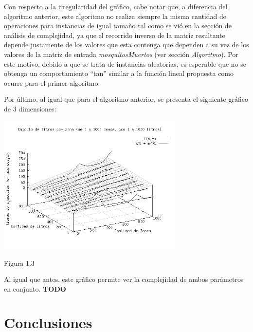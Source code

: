 \documentclass[a4paper,11pt] {article}
\begin{document}
Con respecto a la irregularidad del gr\'afico, cabe notar que, a diferencia del algoritmo anterior, este algoritmo no realiza siempre la misma cantidad de operaciones para instancias de igual tamaño tal como se vi\'o en la secci\'on de an\'alisis de complejidad, ya que el recorrido inverso de la matriz resultante depende justamente de los valores que esta contenga que dependen a su vez de los valores de la matriz de entrada \textit{mosquitosMuertos} (ver secci\'on \textit{Algoritmo}). Por este motivo, debido a que se trata de instancias aleatorias, es esperable que no se obtenga un comportamiento ``tan'' similar a la funci\'on lineal propuesta como ocurre para el primer algoritmo.

Por \'ultimo, al igual que para el algoritmo anterior, se presenta el siguiente gr\'afico de 3 dimensiones:

\begin{center}
 \includegraphics[width=0.7\textwidth]{Plots/Tp2Ej1-TiemposLitrosPorZona-3d-bw.png}
\begin{center}
Figura 1.3
\end{center}
\end{center}

Al igual que antes, este gr\'afico permite ver la complejidad de ambos par\'ametros en conjunto. \textbf{TODO}

\section*{Conclusiones}

\end{document}
